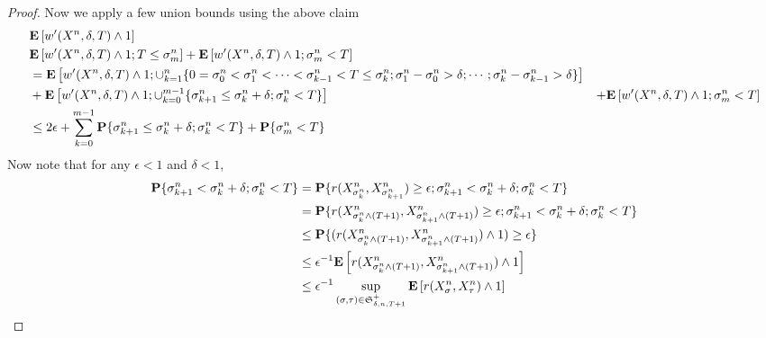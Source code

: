 \begin{proof}
Now we apply a few union bounds using the above claim
\begin{align*}
&\textbf{E}\left[w^\prime(X^n, \delta, T) \wedge 1\right] \\
&\textbf{E}\left[w^\prime(X^n, \delta, T) \wedge 1; T \leq \sigma^n_m\right] + \textbf{E}\left[w^\prime(X^n, \delta, T) \wedge 1; \sigma^n_m < T\right] \\
&= \textbf{E}\left[w^\prime(X^n, \delta, T) \wedge 1; \cup_{k=1}^n \lbrace 0=\sigma^n_0 < \sigma^n_1 < \dotsb < \sigma^n_{k-1} < T \leq \sigma^n_k; \sigma^n_1 - \sigma^n_0 > \delta; \dotsb;\sigma^n_k - \sigma^n_{k-1} > \delta \rbrace\right] \\
&+\textbf{E}\left[w^\prime(X^n, \delta, T) \wedge 1; \cup_{k=0}^{m-1} \lbrace\sigma^n_{k+1} \leq \sigma^n_k+\delta; \sigma^n_k <T \rbrace\right] 
&+ \textbf{E}\left[w^\prime(X^n, \delta, T) \wedge 1; \sigma^n_m < T\right] \\
&\leq 2 \epsilon + \sum_{k=0}^{m-1} \textbf{P}\{\sigma^n_{k+1} \leq \sigma^n_k+\delta; \sigma^n_k <T\} + \textbf{P}\{\sigma^n_m < T\} \\
\end{align*}
Now note that for any $\epsilon < 1$ and $\delta < 1$,
\begin{align*}
\textbf{P}\{\sigma^n_{k+1} < \sigma^n_k + \delta ; \sigma^n_k < T\} 
&=\textbf{P}\{r(X^n_{\sigma^n_k}, X^n_{\sigma^n_{k+1}})  \geq \epsilon ; \sigma^n_{k+1} < \sigma^n_k + \delta ; \sigma^n_k < T\} \\
&=\textbf{P}\{r(X^n_{\sigma^n_k \wedge (T+1)}, X^n_{\sigma^n_{k+1} \wedge (T+1)})  \geq \epsilon ; \sigma^n_{k+1} < \sigma^n_k + \delta ; \sigma^n_k < T\} \\
&\leq \textbf{P}\{(r(X^n_{\sigma^n_k \wedge (T+1)}, X^n_{\sigma^n_{k+1} \wedge (T+1)})  \wedge 1) \geq \epsilon\} \\
&\leq \epsilon^{-1} \textbf{E}\left[r(X^n_{\sigma^n_k \wedge (T+1)}, X^n_{\sigma^n_{k+1} \wedge (T+1)}) \wedge 1\right] \\
&\leq \epsilon^{-1} \sup_{(\sigma, \tau) \in \mathfrak{S}^+_{\delta,n,T+1}} \textbf{E}\left[r(X^n_\sigma, X^n_\tau) \wedge 1\right] 
\end{align*}


\end{proof}
